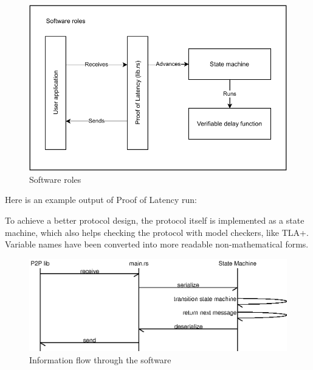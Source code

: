 \begin{figure}
	\includegraphics[width=\textwidth]{pictures/PoL_software_roles.pdf}
	\caption{Software roles}
	\label{software_roles}
\end{figure}

Here is an example output of Proof of Latency run:

To achieve a better protocol design, the protocol itself is implemented as a state machine, which also helps checking the protocol with model checkers, like TLA+. Variable names have been converted into more readable non-mathematical forms.

\begin{figure}
	\includegraphics[width=\textwidth]{pictures/message_flow.eps}
	\caption{Information flow through the software}
	\label{message_flow}
\end{figure}

